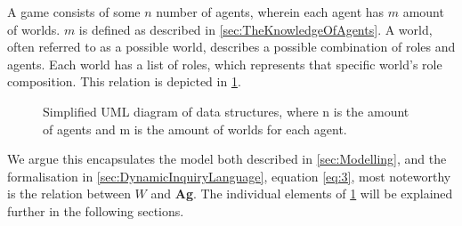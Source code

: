 A game consists of some $n$ number of agents, wherein each agent has $m$ amount
of worlds. $m$ is defined as described in \cref{sec:TheKnowledgeOfAgents}. A
world, often referred to as a possible world, describes a possible combination
of roles and agents. Each world has a list of roles, which represents that
specific world's role composition. This relation is depicted in
\cref{fig:DataStructuresUML}. \renewcommand{\umlfillcolor}{white}
\renewcommand{\umldrawcolor}{blue}
\begin{figure}[H]
	\centering
	\vspace*{3mm}
	\caption{Simplified UML diagram of data structures, where n is the amount of agents and m is the amount of worlds for each agent.}
	\label{fig:DataStructuresUML}
\end{figure}
We argue this encapsulates the model both described in \cref{sec:Modelling}, and the formalisation in
\cref{sec:DynamicInquiryLanguage}, equation \cref{eq:3}, most noteworthy is the relation between $W$ and \textbf{Ag}. The individual elements of \cref{fig:DataStructuresUML} will be explained further in the following sections.
